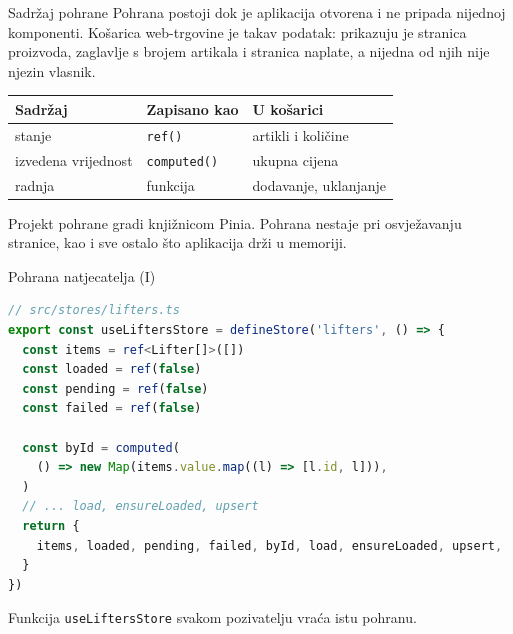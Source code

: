 
\begin{frame}{Sadržaj pohrane}
Pohrana postoji dok je aplikacija otvorena i ne pripada nijednoj komponenti. Košarica web-trgovine je takav podatak: prikazuju je stranica proizvoda, zaglavlje s brojem artikala i stranica naplate, a nijedna od njih nije njezin vlasnik.

\vspace{0.7em}
\begin{center}
{\small
\setlength{\tabcolsep}{6pt}
\renewcommand{\arraystretch}{1.35}
\begin{tabular}{@{}L{3.4cm}L{2.6cm}L{4.4cm}@{}}
  \toprule
  \textbf{Sadržaj} & \textbf{Zapisano kao} & \textbf{U košarici} \\
  \midrule
  stanje & \texttt{ref()} & artikli i količine \\
  izvedena vrijednost & \texttt{computed()} & ukupna cijena \\
  radnja & funkcija & dodavanje, uklanjanje \\
  \bottomrule
\end{tabular}
}
\end{center}

\vspace{0.6em}
Projekt pohrane gradi knjižnicom Pinia. Pohrana nestaje pri osvježavanju stranice, kao i sve ostalo što aplikacija drži u memoriji.
\end{frame}

\begin{frame}[fragile]{Pohrana natjecatelja (I)}
\begin{lstlisting}[language=typescript]
// src/stores/lifters.ts
export const useLiftersStore = defineStore('lifters', () => {
  const items = ref<Lifter[]>([])
  const loaded = ref(false)
  const pending = ref(false)
  const failed = ref(false)

  const byId = computed(
    () => new Map(items.value.map((l) => [l.id, l])),
  )
  // ... load, ensureLoaded, upsert
  return {
    items, loaded, pending, failed, byId, load, ensureLoaded, upsert,
  }
})
\end{lstlisting}

\vspace{0.2em}
Funkcija \texttt{useLiftersStore} svakom pozivatelju vraća istu pohranu.
\end{frame}

